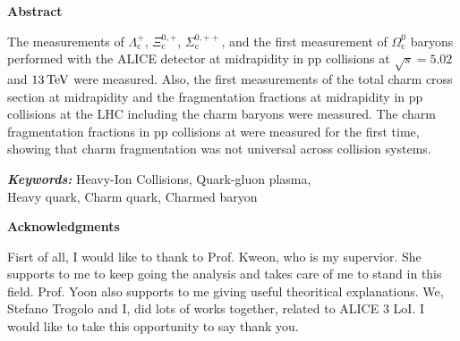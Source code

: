 \begin{center}
{\small \bf Abstract}
\par\end{center}
{\small \par}

{\small
\noindent The measurements of $\Lambda_\mathrm{c}^+$, $\Xi_\mathrm{c}^{0,+}$, $\Sigma_\mathrm{c}^{0,++}$, and the first measurement of $\Omega_\mathrm{c}^0$ baryons performed with the ALICE detector at midrapidity in pp collisions at $\sqrt{s}=5.02$ and $13\,\rm TeV$ were measured.
Also, the first measurements of the total charm cross section at midrapidity and the fragmentation fractions at midrapidity in pp collisions at the LHC including the charm baryons were measured.
The charm fragmentation fractions in pp collisions at \tevf were measured for the first time, showing that charm fragmentation was not universal across collision systems.
}{\small \par}

\begin{center}
{\small \bf{\it Keywords:}}
{\small Heavy-Ion Collisions, Quark-gluon plasma,\\Heavy quark, Charm quark, Charmed baryon}
\par\end{center}
{\small \par}

\newpage{}
\thispagestyle{empty}
\begin{center}
    { \bf Acknowledgments}\\
    \vskip 0.8cm
\par\end{center}

{\small
Fisrt of all, I would like to thank to Prof. Kweon, who is my supervior. 
She supports to me to keep going the analysis and takes care of me to stand in this field.
Prof. Yoon also supports to me giving useful theoritical explanations.
We, Stefano Trogolo and I, did lots of works together, related to ALICE 3 LoI. 
I would like to take this opportunity to say thank you.
}{\small \par}
